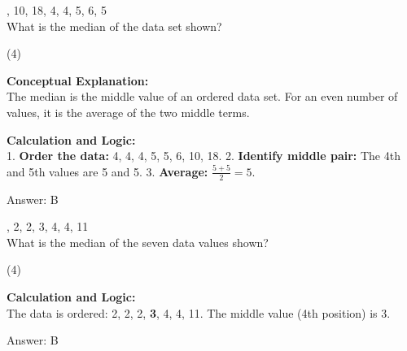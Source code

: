 \documentclass[11pt,paper=a4,answers]{exam}
\begin{document}
\begin{questions}
\pointsinrightmargin
\pointsdroppedatright
\marksnotpoints
{}
\pointformat{\boldmath\themarginpoints}
\bracketedpoints

, 10, 18, 4, 4, 5, 6, 5 \\
What is the median of the data set shown?
\begin{tasks}(4)
\end{tasks}

\begin{solution}
\textbf{Conceptual Explanation:} \\
The median is the middle value of an ordered data set. For an even number of values, it is the average of the two middle terms.

\vspace{30pt}

\textbf{Calculation and Logic:} \\
1. \textbf{Order the data:} 4, 4, 4, 5, 5, 6, 10, 18.
2. \textbf{Identify middle pair:} The 4th and 5th values are 5 and 5.
3. \textbf{Average:} $\frac{5+5}{2} = 5$.

\vspace{30pt}

Answer: \colorbox{yellow!100}{B}
\end{solution}

\vspace{60pt}

, 2, 2, 3, 4, 4, 11 \\
What is the median of the seven data values shown?
\begin{tasks}(4)
\end{tasks}

\begin{solution}
\textbf{Calculation and Logic:} \\
The data is ordered: 2, 2, 2, \textbf{3}, 4, 4, 11. The middle value (4th position) is 3.

\vspace{30pt}

Answer: \colorbox{yellow!100}{B}
\end{solution}


\end{questions}
\end{document}
